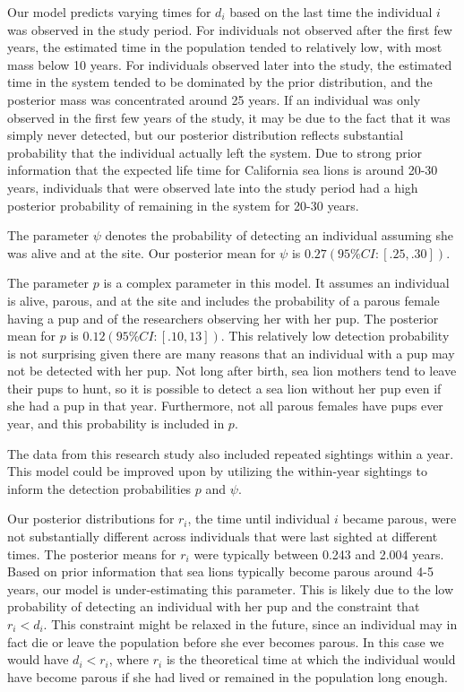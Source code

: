\documentclass[12pt, a4paper]{article}
\begin{document}
Our model predicts varying times for $d_i$ based on the last time the individual $i$ was observed in the study period. For individuals not observed after the first few years, the estimated time in the population tended to relatively low, with most mass below 10 years. For individuals observed later into the study, the estimated time in the system tended to be dominated by the prior distribution, and the posterior mass was concentrated around 25 years. If an individual was only observed in the first few years of the study, it may be due to the fact that it was simply never detected, but our posterior distribution reflects substantial probability that the individual actually left the system. Due to strong prior information that the expected life time for California sea lions is around 20-30 years, individuals that were observed late into the study period had a high posterior probability of remaining in the system for 20-30 years. 

The parameter $\psi$ denotes the probability of detecting an individual assuming she was alive and at the site. Our posterior mean for $\psi$ is $0.27 (95\% CI: [.25, .30])$. 

The parameter $p$ is a complex parameter in this model. It assumes an individual is alive, parous, and at the site and includes the probability of a parous female having a pup and of the researchers observing her with her pup. The posterior mean for $p$ is $0.12 (95\% CI: [.10, 13])$. This relatively low detection probability is not surprising given there are many reasons that an individual with a pup may not be detected with her pup. Not long after birth, sea lion mothers tend to leave their pups to hunt, so it is possible to detect a sea lion without her pup even if she had a pup in that year. Furthermore, not all parous females have pups ever year, and this probability is included in $p$. 

The data from this research study also included repeated sightings within a year. This model could be improved upon by utilizing the within-year sightings to inform the detection probabilities $p$ and $\psi$. 

Our posterior distributions for $r_i$, the time until individual $i$ became parous, were not substantially different across individuals that were last sighted at different times.  The posterior means for $r_i$ were typically between 0.243 and 2.004 years. Based on prior information that sea lions typically become parous around 4-5 years, our model is under-estimating this parameter. This is likely due to the low probability of detecting an individual with her pup and the constraint that $r_i < d_i$. This constraint might be relaxed in the future, since an individual may in fact die or leave the population before she ever becomes parous. In this case we would have $d_i < r_i$, where $r_i$ is the theoretical time at which the individual would have become parous if she had lived or remained in the population long enough. 
\end{document}
